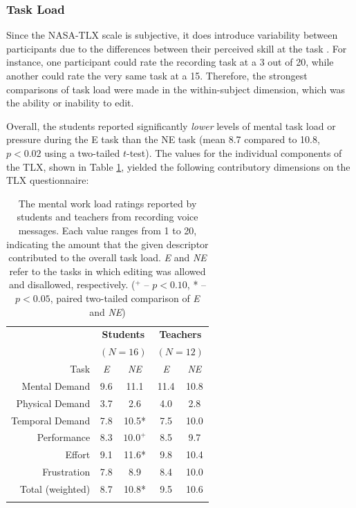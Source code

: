 \subsubsection{Task Load}
Since the NASA-TLX scale is subjective, it does introduce variability between participants due to the differences between their perceived skill at the task \cite{nasatlx}. 
For instance, one participant could rate the recording task at a 3 out of 20, while another could rate the very same task at a 15.
Therefore, the strongest comparisons of task load were made in the within-subject dimension, which was the ability or inability to edit.

Overall, the students reported significantly \emph{lower} levels of mental task load or pressure during the E task than the NE task (mean 8.7 compared to 10.8, $p<0.02$ using a two-tailed $t$-test). 
The values for the individual components of the TLX, shown in Table \ref{tab:table1}, yielded the following contributory dimensions on the TLX questionnaire:

\begin{table}
	\centering
	\begin{tabular}{r c c c c}
		& \multicolumn{2}{c}{\textbf{Students}} & \multicolumn{2}{c}{\textbf{Teachers}}\\
		& \multicolumn{2}{c}{$(N=16)$} & \multicolumn{2}{c}{$(N=12)$}\\
		\toprule
		Task			& \textit{E} & \textit{NE} & \textit{E} & \textit{NE}\\
		Mental Demand   & 9.6 & 11.1  & 11.4 & 10.8 \\
		Physical Demand & 3.7 & 2.6   & 4.0  & 2.8  \\
		Temporal Demand & 7.8 & 10.5*  & 7.5  & 10.0 \\
		Performance     & 8.3 & $10.0^+$  & 8.5  & 9.7  \\
		Effort          & 9.1 & 11.6*  & 9.8  & 10.4 \\
		Frustration     & 7.8 & 8.9   & 8.4  & 10.0 \\
		\midrule
		Total (weighted)& 8.7 & 10.8* & 9.5  & 10.6 \\
		\bottomrule \\
	\end{tabular}
	\caption{The mental work load ratings reported by students and teachers from recording voice messages. Each value ranges from 1 to 20, indicating the amount that the given descriptor contributed to the overall task load. \textit{E} and \textit{NE} refer to the tasks in which editing was allowed and disallowed, respectively. ($^+$ -- $p<0.10$, * -- $p<0.05$, paired two-tailed comparison of \textit{E} and \textit{NE})}~\label{tab:table1}
\end{table}


